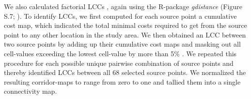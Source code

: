 \documentclass[abstract=off,10pt,a4paper,bibliography=totocnumbered]{article}
\begin{document}
We also calculated factorial LCCs \citep{Pinto.2009, Sawyer.2011, Elliot.2014},
again using the R-package \textit{gdistance} (Figure S.7;
\citealp{vanEtten.2017}). To identify LCCs, we first computed for each source
point a cumulative cost map, which indicated the total minimal costs required to
get from the source point to any other location in the study area. We then
obtained an LCC between two source points by adding up their cumulative cost
maps and masking out all cell-values exceeding the lowest cell-value by more
than 5\% \citep{Pinto.2009}. We repeated this procedure for each possible unique
pairwise combination of source points and thereby identified LCCs between all 68
selected source points. We normalized the resulting corridor-maps to range from
zero to one and tallied them into a single connectivity map.
\end{document}
